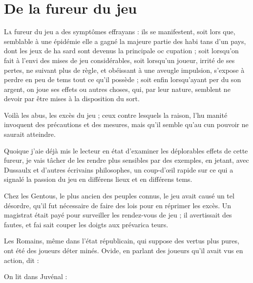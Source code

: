 \chapter[De la Fureur du Jeu]{De la fureur du jeu}

\lettrine{L}{a} fureur du jeu a des symptômes
effrayans : ils se manifestent, soit lors%
que, semblable à une épidémie elle
a gagné la majeure partie des habi%
tans d'un pays, dont les jeux de ha%
sard sont devenus la principale oc%
cupation ; soit lorsqu'on fait à l'envi
des mises de jeu considérables, soit
lorsqu'un joueur, irrité de ses pertes,
ne suivant plus de règle, et obéissant
à une aveugle impulsion, s'expose à
perdre en peu de tems tout ce qu'il
possède ; soit enfin lorsqu'ayant per%
du son argent, on joue ses effets ou
autres choses, qui, par leur nature,
semblent ne devoir par être mises à la
disposition du sort.

Voilà les abus, les excès du jeu ;
ceux contre lesquels la raison, l'hu%
manité invoquent des précautions et
des mesures, mais qu'il semble qu'au%
cun pouvoir ne saurait atteindre.

Quoique j'aie déjà mis le lecteur
en état d'examiner les déplorables
effets de cette fureur, je vais tâcher
de les rendre plus sensibles par des
exemples, en jetant, avec Dussaulx
et d'autres écrivains philosophes, un
coup-d'œil rapide sur ce qui a signalé
la passion du jeu en différens lieux
et en différens tems.

Chez les Gentous, le plus ancien
des peuples connus, le jeu avait causé
un tel désordre, qu'il fut nécessaire
de faire des lois pour en réprimer
les excès. Un magistrat était payé
pour surveiller les rendez-vous de
jeu ; il avertissait des fautes, et fai%
sait couper les doigts aux prévarica%
teurs.

Les Romains, même dans l'état
républicain, qui suppose des vertus
plus pures, ont été des joueurs déter%
minés. Ovide, en parlant des joueurs
qu'il avait vus en action, dit : 

On lit dans Juvénal : 


